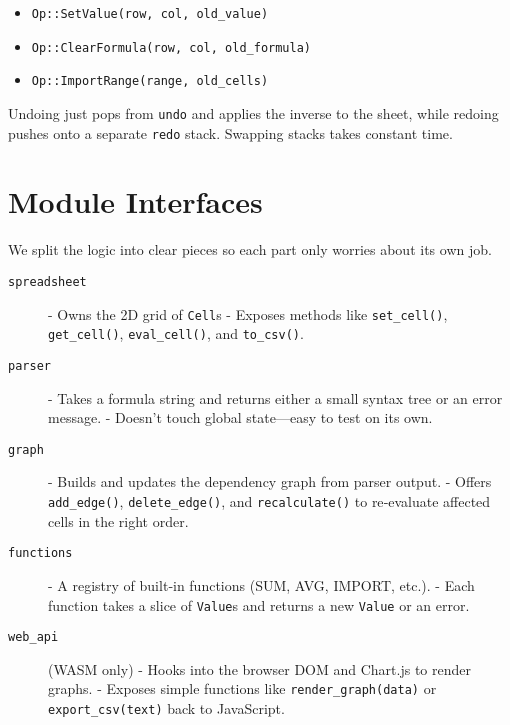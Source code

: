 \documentclass[12pt]{article}
\begin{document}
    \begin{itemize}
        \item \texttt{Op::SetValue(row, col, old\_value)}
        \item \texttt{Op::ClearFormula(row, col, old\_formula)}
        \item \texttt{Op::ImportRange(range, old\_cells)}
    \end{itemize}

    Undoing just pops from \texttt{undo} and applies the inverse to the sheet, while redoing pushes onto a separate \texttt{redo} stack.  Swapping stacks takes constant time.

    \section{Module Interfaces}

    We split the logic into clear pieces so each part only worries about its own job.

    \begin{description}
        \item[\texttt{spreadsheet}]
        - Owns the 2D grid of \texttt{Cell}s
        - Exposes methods like \texttt{set\_cell()}, \texttt{get\_cell()}, \texttt{eval\_cell()}, and \texttt{to\_csv()}.

        \item[\texttt{parser}]
        - Takes a formula string and returns either a small syntax tree or an error message.
        - Doesn’t touch global state—easy to test on its own.

        \item[\texttt{graph}]
        - Builds and updates the dependency graph from parser output.
        - Offers \texttt{add\_edge()}, \texttt{delete\_edge()}, and \texttt{recalculate()} to re‐evaluate affected cells in the right order.

        \item[\texttt{functions}]
        - A registry of built‐in functions (SUM, AVG, IMPORT, etc.).
        - Each function takes a slice of \texttt{Value}s and returns a new \texttt{Value} or an error.

        \item[\texttt{web\_api}] (WASM only)
        - Hooks into the browser DOM and Chart.js to render graphs.
        - Exposes simple functions like \texttt{render\_graph(data)} or \texttt{export\_csv(text)} back to JavaScript.
    \end{description}
\end{document}
